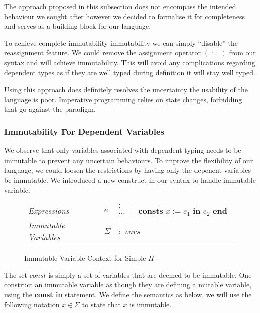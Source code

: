 \documentclass[a4paper,12pt]{report}
\begin{document}
\par
The approach proposed in this subsection does not encompass the intended behaviour we 
sought after however we decided to formalise it for completeness and serves as 
a building block for our language. 

\par
To achieve complete immutability immutability we can simply ``disable'' the 
reassignment feature. We could remove the assignment operator $(:=)$ from our 
syntax and will achieve immutability. This will avoid any complications 
regarding dependent types as 
if they are well typed during definition it will stay well typed. 

\par
Using this approach does definitely resolves the uncertainty the usability of 
the language is poor. Imperative programming relies on state changes, forbidding 
that go against the paradigm. 

\subsubsection{Immutability For Dependent Variables}
We observe that only variables associated with dependent typing needs to be 
immutable to prevent any uncertain behaviours. To improve the flexibility of our 
language, we could loosen the restrictions by having only the depenent variables 
be immutable. We introduced a new construct in our syntax to handle immutable 
variable. 

\begin{figure}[H]
  \begin{center}
    \begin{tabular} {l l l}
      \textit{Expressions} & $e$& $:$ $...\text{ }|\text{ }
        \textbf{consts }x := e_1 \textbf{ in }e_2\textbf{ end}$ \\
      \textit{Immutable Variables} & $\Sigma$ & $:$ $vars$ \\
    \end{tabular}
  \end{center}
  \caption{Immutable Variable Context for Simple-$\Pi$}
\end{figure}

The set $const$ is simply a set of variables that are deemed to be immutable. 
One construct an immutable variable as though they are defining a mutable 
variable, using the \textbf{const in} statement. We define the semantics as 
below, we will use the following notation $x \in \Sigma$ to state that $x$ is 
immutable.
\end{document}
